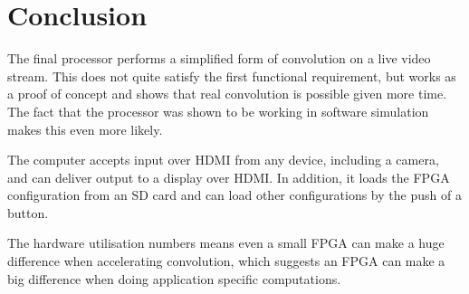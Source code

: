 \section{Conclusion}
The final processor performs a simplified form of convolution on a live video stream.
This does not quite satisfy the first functional requirement,
but works as a proof of concept and shows that real convolution is possible given more time.
The fact that the processor was shown to be working in software simulation makes this even more likely.

The computer accepts input over HDMI from any device, including a camera, and can deliver output to a display over HDMI.
In addition,
it loads the FPGA configuration from an SD card and can load other configurations by the push of a button.

The hardware utilisation numbers means even a small FPGA can make a huge difference when accelerating convolution,
which suggests an FPGA can make a big difference when doing application specific computations.


